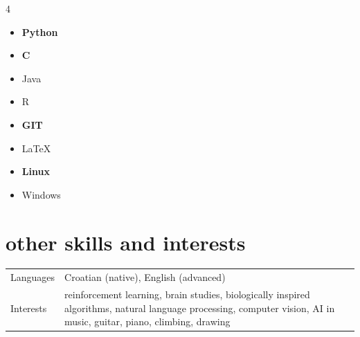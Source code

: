 \documentclass[a4paper]{article}
\makeatletter
\newlength{\tablewidth}
\newenvironment{skills}{%
\setlength{\tablewidth}{\linewidth}
\addtolength{\tablewidth}{-2\tabcolsep}
\begin{tabular}{@{}p{0.15\tablewidth}p{0.85\tablewidth}@{}}
}{%
\end{tabular}
}
\makeatother
\begin{document}
\begin{multicols}{4}


\begin{itemize}

\item  \textbf{Python}
\item  \textbf{C}
\end{itemize}

\columnbreak
\begin{itemize}

\item  Java
\item  R
\end{itemize}
\columnbreak

\begin{itemize}
        \item \textbf{GIT}
        \item LaTeX
    \end{itemize}
    
\columnbreak


\begin{itemize}
\item  \textbf{Linux}
\item  Windows
    \end{itemize}
    
\columnbreak
\end{multicols}

\section{other skills and interests}
\begin{skills}
    Languages & Croatian (native), English (advanced) \\
    Interests & reinforcement learning, brain studies, biologically inspired algorithms, natural language processing, computer vision, AI in music, guitar, piano, climbing, drawing\\
\end{skills}
\end{document}
